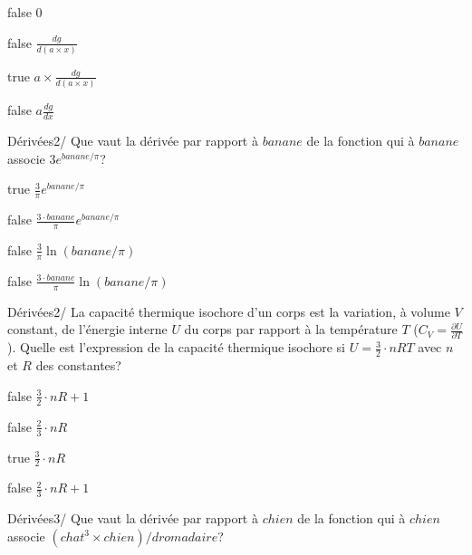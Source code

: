             \begin{reponses}
            	\item[false] $0$
            	\item[false] $\frac{dg}{d(a\times x)}$
                \item[true] $a\times \frac{dg}{d(a\times x)}$
                \item[false] $a\frac{dg}{dx}$
            \end{reponses}
            \begin{question}{22}{Dérivées}{2}{/}
                Que vaut la dérivée par rapport à $banane$ de la fonction qui à $banane$ associe $3e^{banane/\pi}$?
            \end{question}
            \begin{reponses}
                \item[true] $\frac{3}{\pi}e^{banane/\pi}$
                \item[false] $\frac{3\cdot banane}{\pi}e^{banane/\pi}$
                \item[false] $\frac{3}{\pi}\ln(banane/\pi)$
                \item[false] $\frac{3\cdot banane}{\pi}\ln(banane/\pi)$
            \end{reponses}
            \begin{question}{22}{Dérivées}{2}{/}
                La capacité thermique isochore d'un corps est la variation, à volume $V$ constant, de l'énergie interne $U$ du corps par rapport à la température $T$ ($C_V=\frac{\partial U}{\partial T}$). Quelle est l'expression de la capacité thermique isochore si $U=\frac{3}{2}\cdot nRT$ avec $n$ et $R$ des constantes?
            \end{question}
            \begin{reponses}
                \item[false] $\frac{3}{2}\cdot nR+1$
                \item[false] $\frac{2}{3}\cdot nR$
                \item[true] $\frac{3}{2}\cdot nR$
                \item[false] $\frac{2}{3}\cdot nR+1$
            \end{reponses}
            \begin{question}{22}{Dérivées}{3}{/}
                Que vaut la dérivée par rapport à $chien$ de la fonction qui à $chien$ associe $(chat^3\times chien)/dromadaire$?
            \end{question}
